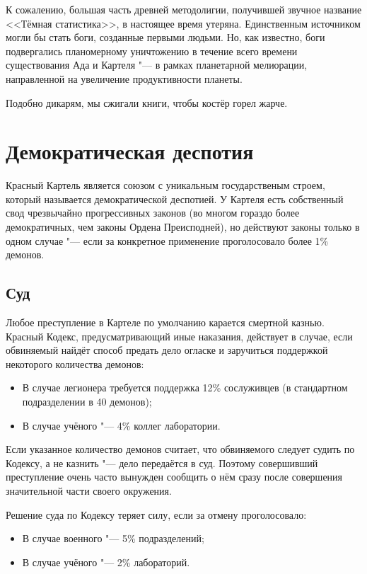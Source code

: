 К сожалению, большая часть древней методолигии, получившей звучное название <<Тёмная статистика>>, в настоящее время утеряна.
Единственным источником могли бы стать боги, созданные первыми людьми.
Но, как известно, боги подвергались планомерному уничтожению в течение всего времени существования Ада и Картеля "--- в рамках планетарной мелиорации, направленной на увеличение продуктивности планеты.

Подобно дикарям, мы сжигали книги, чтобы костёр горел жарче.

\section{Демократическая деспотия}

Красный Картель является союзом с уникальным государственым строем, который называется демократической деспотией.
У Картеля есть собственный свод чрезвычайно прогрессивных законов (во многом гораздо более демократичных, чем законы Ордена Преисподней), но действуют законы только в одном случае "--- если за конкретное применение проголосовало более 1\% демонов.

\subsection{Суд}

Любое преступление в Картеле по умолчанию карается смертной казнью.
Красный Кодекс, предусматривающий иные наказания, действует в случае, если обвиняемый найдёт способ предать дело огласке и заручиться поддержкой некоторого количества демонов:

\begin{itemize}
\item В случае легионера требуется поддержка 12\% сослуживцев (в стандартном подразделении в 40 демонов);
\item В случае учёного "--- 4\% коллег лаборатории.
\end{itemize}

Если указанное количество демонов считает, что обвиняемого следует судить по Кодексу, а не казнить "--- дело передаётся в суд.
Поэтому совершивший преступление очень часто вынужден сообщить о нём сразу после совершения значительной части своего окружения.

Решение суда по Кодексу теряет силу, если за отмену проголосовало:

\begin{itemize}
\item В случае военного "--- 5\% подразделений;
\item В случае учёного "--- 2\% лабораторий.
\end{itemize}

